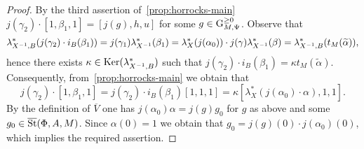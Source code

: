 \begin{proof}
    By the third assertion of~\cref{prop:horrocks-main} $j(\gamma_2) \cdot [1, \beta_1, 1] = [j(g), h, u]$ for some $g \in \operatorname{G}_{M, \Psi}^{\geq 0}$.
    Observe that
    \[ \lambda_{X^{-1}, B}^* (j(\gamma_2) \cdot i_B(\beta_1)) = j(\gamma_1) \lambda_{X^{-1}}^*(\beta_1) = \lambda_X^*(j(\alpha_0)) \cdot j(\gamma) \lambda_{X^{-1}}^*(\beta) = \lambda_{X^{-1}, B}^*(t_M(\widetilde{\alpha})), \]
    hence there exists $\kappa \in \operatorname{Ker}(\lambda^*_{X^{-1}, B})$ such that $j(\gamma_2) \cdot i_B(\beta_1) = \kappa t_M(\widetilde{\alpha})$.
    Consequently, from~\cref{prop:horrocks-main} we obtain that
    \[j(\gamma_2) \cdot [1, \beta_1, 1] = j(\gamma_2) \cdot i_B(\beta_1) [1, 1, 1] = \kappa [\lambda_X^*(j(\alpha_0) \cdot \alpha), 1, 1].\]
    By the definition of $\overline{V}$ one has $j(\alpha_0) \alpha = j(g) g_0$ for $g$ as above and some $g_0 \in \overline{\operatorname{St}}(\Phi, A, M)$.
    Since $\alpha(0) = 1$ we obtain that $g_0 = j(g)(0) \cdot j(\alpha_0)(0)$, which implies the required assertion.
\end{proof}